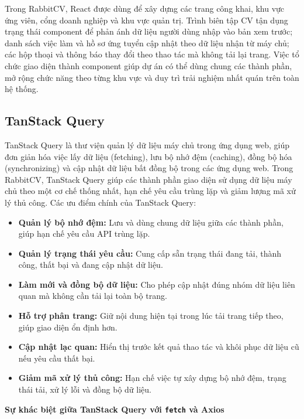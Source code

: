 Trong RabbitCV, React được dùng để xây dựng các trang công khai, khu vực ứng viên, cổng doanh nghiệp và khu vực quản trị. Trình biên tập CV tận dụng trạng thái component để phản ánh dữ liệu người dùng nhập vào bản xem trước; danh sách việc làm và hồ sơ ứng tuyển cập nhật theo dữ liệu nhận từ máy chủ; các hộp thoại và thông báo thay đổi theo thao tác mà không tải lại trang. Việc tổ chức giao diện thành component giúp dự án có thể dùng chung các thành phần, mở rộng chức năng theo từng khu vực và duy trì trải nghiệm nhất quán trên toàn hệ thống.

\subsection{TanStack Query}

TanStack Query là thư viện quản lý dữ liệu máy chủ trong ứng dụng web, giúp đơn giản hóa việc lấy dữ liệu (fetching), lưu bộ nhớ đệm (caching), đồng bộ hóa (synchronizing) và cập nhật dữ liệu bất đồng bộ trong các ứng dụng web. Trong RabbitCV, TanStack Query giúp các thành phần giao diện sử dụng dữ liệu máy chủ theo một cơ chế thống nhất, hạn chế yêu cầu trùng lặp và giảm lượng mã xử lý thủ công. Các ưu điểm chính của TanStack Query:

\begin{itemize}
    \item \textbf{Quản lý bộ nhớ đệm:} Lưu và dùng chung dữ liệu giữa các thành phần, giúp hạn chế yêu cầu API trùng lặp.

    \item \textbf{Quản lý trạng thái yêu cầu:} Cung cấp sẵn trạng thái đang tải, thành công, thất bại và đang cập nhật dữ liệu.

    \item \textbf{Làm mới và đồng bộ dữ liệu:} Cho phép cập nhật đúng nhóm dữ liệu liên quan mà không cần tải lại toàn bộ trang.

    \item \textbf{Hỗ trợ phân trang:} Giữ nội dung hiện tại trong lúc tải trang tiếp theo, giúp giao diện ổn định hơn.

    \item \textbf{Cập nhật lạc quan:} Hiển thị trước kết quả thao tác và khôi phục dữ liệu cũ nếu yêu cầu thất bại.

    \item \textbf{Giảm mã xử lý thủ công:} Hạn chế việc tự xây dựng bộ nhớ đệm, trạng thái tải, xử lý lỗi và đồng bộ dữ liệu.
\end{itemize}
\medskip
\noindent\textbf{Sự khác biệt giữa TanStack Query với \texttt{fetch} và Axios}
\medskip

